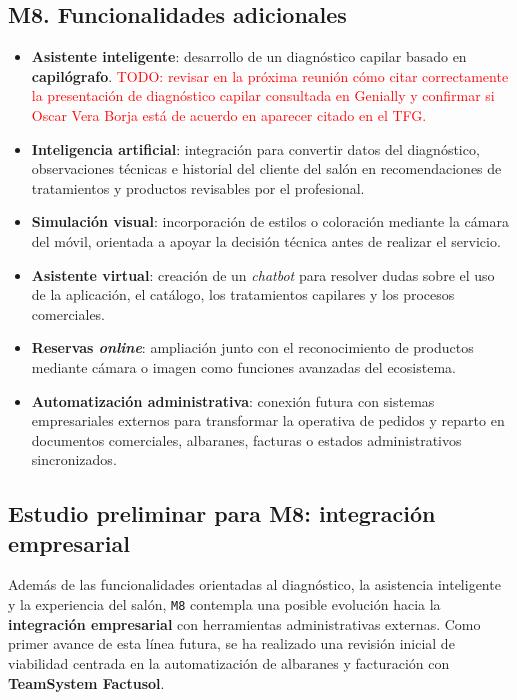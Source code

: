 \subsection*{M8. Funcionalidades adicionales}

\begin{itemize}
    \item \textbf{Asistente inteligente}: desarrollo de un diagnóstico capilar basado en \textbf{capilógrafo}. \textcolor{red}{TODO: revisar en la próxima reunión cómo citar correctamente la presentación de diagnóstico capilar consultada en Genially y confirmar si Oscar Vera Borja está de acuerdo en aparecer citado en el TFG.}
    \item \textbf{Inteligencia artificial}: integración para convertir datos del diagnóstico, observaciones técnicas e historial del cliente del salón en recomendaciones de tratamientos y productos revisables por el profesional.
    \item \textbf{Simulación visual}: incorporación de estilos o coloración mediante la cámara del móvil, orientada a apoyar la decisión técnica antes de realizar el servicio.
    \item \textbf{Asistente virtual}: creación de un \textit{chatbot} para resolver dudas sobre el uso de la aplicación, el catálogo, los tratamientos capilares y los procesos comerciales.
    \item \textbf{Reservas \textit{online}}: ampliación junto con el reconocimiento de productos mediante cámara o imagen como funciones avanzadas del ecosistema.
    \item \textbf{Automatización administrativa}: conexión futura con sistemas empresariales externos para transformar la operativa de pedidos y reparto en documentos comerciales, albaranes, facturas o estados administrativos sincronizados.
\end{itemize}

\subsection*{Estudio preliminar para M8: integración empresarial}

Además de las funcionalidades orientadas al diagnóstico, la asistencia inteligente y la experiencia del salón, \texttt{M8} contempla una posible evolución hacia la \textbf{integración empresarial} con herramientas administrativas externas. Como primer avance de esta línea futura, se ha realizado una revisión inicial de viabilidad centrada en la automatización de albaranes y facturación con \textbf{TeamSystem Factusol}.

